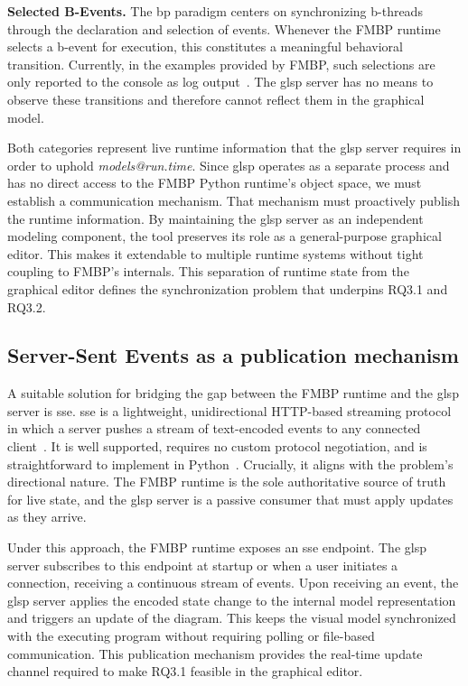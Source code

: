 \textbf{Selected B-Events.}
The \gls{bp} paradigm centers on synchronizing b-threads through the declaration and selection of events.
Whenever the FMBP runtime selects a b-event for execution, this constitutes a meaningful behavioral transition.
Currently, in the examples provided by FMBP, such selections are only reported to the console as log output~\cite{felber_tfelbrfmbp_2025}.
The \gls{glsp} server has no means to observe these transitions and therefore cannot reflect them in the graphical model.

Both categories represent live runtime information that the \gls{glsp} server requires in order to uphold \textit{models@run.time}.
Since \gls{glsp} operates as a separate process and has no direct access to the FMBP Python runtime's object space, we must establish a communication mechanism.
That mechanism must proactively publish the runtime information.
By maintaining the \gls{glsp} server as an independent modeling component, the tool preserves its role as a general-purpose graphical editor.
This makes it extendable to multiple runtime systems without tight coupling to FMBP's internals.
This separation of runtime state from the graphical editor defines the synchronization problem that underpins RQ3.1 and RQ3.2.

\subsection{Server-Sent Events as a publication mechanism}
\label{subsec:concept_fmbp_sse}
 
A suitable solution for bridging the gap between the FMBP runtime and the \gls{glsp} server is \gls{sse}.
\gls{sse} is a lightweight, unidirectional HTTP-based streaming protocol in which a server pushes a stream of text-encoded events to any connected client~\cite{de_la_torre_using_2019}.
It is well supported, requires no custom protocol negotiation, and is straightforward to implement in Python~\cite{ramirez_sebastian_server-sent_nodate}.
Crucially, it aligns with the problem's directional nature.
The FMBP runtime is the sole authoritative source of truth for live state, and the \gls{glsp} server is a passive consumer that must apply updates as they arrive.
 
Under this approach, the FMBP runtime exposes an \gls{sse} endpoint.
The \gls{glsp} server subscribes to this endpoint at startup or when a user initiates a connection, receiving a continuous stream of events.
Upon receiving an event, the \gls{glsp} server applies the encoded state change to the internal model representation and triggers an update of the diagram.
This keeps the visual model synchronized with the executing program without requiring polling or file-based communication.
This publication mechanism provides the real-time update channel required to make RQ3.1 feasible in the graphical editor.

